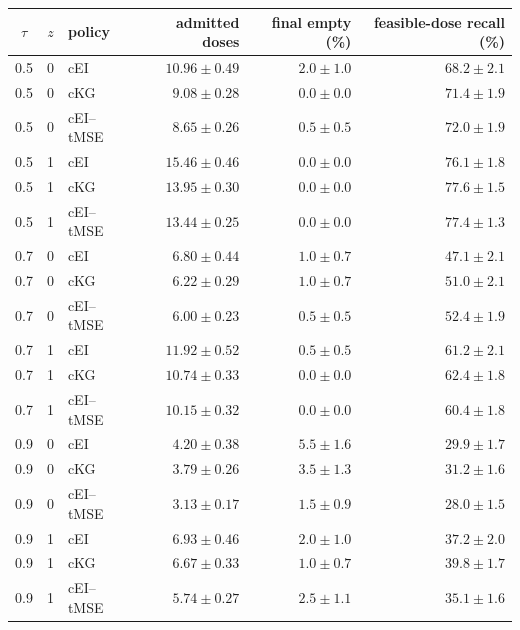 \begin{tabular}{@{}cclrrr@{}}
\toprule
$\tau$ & $z$ & policy & admitted doses & final empty (\%) & feasible-dose recall (\%) \\
\midrule
0.5 & 0 & cEI & $10.96{\pm}0.49$ & $2.0{\pm}1.0$ & $68.2{\pm}2.1$ \\
0.5 & 0 & cKG & $9.08{\pm}0.28$ & $0.0{\pm}0.0$ & $71.4{\pm}1.9$ \\
0.5 & 0 & cEI--tMSE & $8.65{\pm}0.26$ & $0.5{\pm}0.5$ & $72.0{\pm}1.9$ \\
0.5 & 1 & cEI & $15.46{\pm}0.46$ & $0.0{\pm}0.0$ & $76.1{\pm}1.8$ \\
0.5 & 1 & cKG & $13.95{\pm}0.30$ & $0.0{\pm}0.0$ & $77.6{\pm}1.5$ \\
0.5 & 1 & cEI--tMSE & $13.44{\pm}0.25$ & $0.0{\pm}0.0$ & $77.4{\pm}1.3$ \\
0.7 & 0 & cEI & $6.80{\pm}0.44$ & $1.0{\pm}0.7$ & $47.1{\pm}2.1$ \\
0.7 & 0 & cKG & $6.22{\pm}0.29$ & $1.0{\pm}0.7$ & $51.0{\pm}2.1$ \\
0.7 & 0 & cEI--tMSE & $6.00{\pm}0.23$ & $0.5{\pm}0.5$ & $52.4{\pm}1.9$ \\
0.7 & 1 & cEI & $11.92{\pm}0.52$ & $0.5{\pm}0.5$ & $61.2{\pm}2.1$ \\
0.7 & 1 & cKG & $10.74{\pm}0.33$ & $0.0{\pm}0.0$ & $62.4{\pm}1.8$ \\
0.7 & 1 & cEI--tMSE & $10.15{\pm}0.32$ & $0.0{\pm}0.0$ & $60.4{\pm}1.8$ \\
0.9 & 0 & cEI & $4.20{\pm}0.38$ & $5.5{\pm}1.6$ & $29.9{\pm}1.7$ \\
0.9 & 0 & cKG & $3.79{\pm}0.26$ & $3.5{\pm}1.3$ & $31.2{\pm}1.6$ \\
0.9 & 0 & cEI--tMSE & $3.13{\pm}0.17$ & $1.5{\pm}0.9$ & $28.0{\pm}1.5$ \\
0.9 & 1 & cEI & $6.93{\pm}0.46$ & $2.0{\pm}1.0$ & $37.2{\pm}2.0$ \\
0.9 & 1 & cKG & $6.67{\pm}0.33$ & $1.0{\pm}0.7$ & $39.8{\pm}1.7$ \\
0.9 & 1 & cEI--tMSE & $5.74{\pm}0.27$ & $2.5{\pm}1.1$ & $35.1{\pm}1.6$ \\
\bottomrule
\end{tabular}
